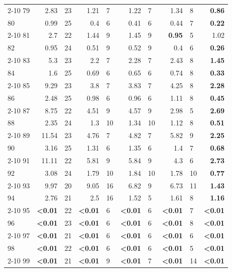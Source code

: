 \begin{longtable}{lr@{\hskip 4pt}l@{\hskip 12pt}r@{\hskip 4pt}l@{\hskip 12pt}r@{\hskip 4pt}l@{\hskip 12pt}r@{\hskip 4pt}l@{\hskip 12pt}r}
\cmidrule{2-10}
79 & 2.83 & 23 & 1.21 & 7 & 1.22 & 7 & 1.34 & 8 & \textbf{0.86} \\
80 & 0.99 & 25 & 0.4 & 6 & 0.41 & 6 & 0.44 & 7 & \textbf{0.22} \\
\cmidrule{2-10}
81 & 2.7 & 22 & 1.44 & 9 & 1.45 & 9 & \textbf{0.95} & 5 & 1.02 \\
82 & 0.95 & 24 & 0.51 & 9 & 0.52 & 9 & 0.4 & 6 & \textbf{0.26} \\
\cmidrule{2-10}
83 & 5.3 & 23 & 2.2 & 7 & 2.28 & 7 & 2.43 & 8 & \textbf{1.45} \\
84 & 1.6 & 25 & 0.69 & 6 & 0.65 & 6 & 0.74 & 8 & \textbf{0.33} \\
\cmidrule{2-10}
85 & 9.29 & 23 & 3.8 & 7 & 3.83 & 7 & 4.25 & 8 & \textbf{2.28} \\
86 & 2.48 & 25 & 0.98 & 6 & 0.96 & 6 & 1.11 & 8 & \textbf{0.45} \\
\cmidrule{2-10}
87 & 8.75 & 22 & 4.51 & 9 & 4.57 & 9 & 2.98 & 5 & \textbf{2.69} \\
88 & 2.35 & 24 & 1.3 & 10 & 1.34 & 10 & 1.12 & 8 & \textbf{0.51} \\
\cmidrule{2-10}
89 & 11.54 & 23 & 4.76 & 7 & 4.82 & 7 & 5.82 & 9 & \textbf{2.25} \\
90 & 3.16 & 25 & 1.31 & 6 & 1.35 & 6 & 1.4 & 7 & \textbf{0.68} \\
\cmidrule{2-10}
91 & 11.11 & 22 & 5.81 & 9 & 5.84 & 9 & 4.3 & 6 & \textbf{2.73} \\
92 & 3.08 & 24 & 1.79 & 10 & 1.84 & 10 & 1.78 & 10 & \textbf{0.77} \\
\cmidrule{2-10}
93 & 9.97 & 20 & 9.05 & 16 & 6.82 & 9 & 6.73 & 11 & \textbf{1.43} \\
94 & 2.76 & 21 & 2.5 & 16 & 1.52 & 5 & 1.61 & 8 & \textbf{1.16} \\
\cmidrule{2-10}
95 & \textbf{<0.01} & 22 & \textbf{<0.01} & 6 & \textbf{<0.01} & 6 & \textbf{<0.01} & 7 & \textbf{<0.01} \\
96 & \textbf{<0.01} & 23 & \textbf{<0.01} & 6 & \textbf{<0.01} & 6 & \textbf{<0.01} & 8 & \textbf{<0.01} \\
\cmidrule{2-10}
97 & \textbf{<0.01} & 21 & \textbf{<0.01} & 6 & \textbf{<0.01} & 6 & \textbf{<0.01} & 6 & \textbf{<0.01} \\
98 & \textbf{<0.01} & 22 & \textbf{<0.01} & 6 & \textbf{<0.01} & 6 & \textbf{<0.01} & 5 & \textbf{<0.01} \\
\cmidrule{2-10}
99 & \textbf{<0.01} & 21 & \textbf{<0.01} & 9 & \textbf{<0.01} & 7 & \textbf{<0.01} & 14 & \textbf{<0.01} \\

\end{longtable}
